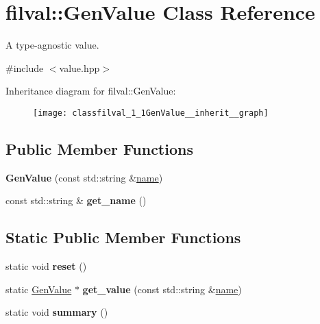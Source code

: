 \hypertarget{classfilval_1_1GenValue}{}\section{filval\+:\+:Gen\+Value Class Reference}
\label{classfilval_1_1GenValue}


A type-\/agnostic value.  




{\ttfamily \#include $<$value.\+hpp$>$}



Inheritance diagram for filval\+:\+:Gen\+Value\+:
\nopagebreak
\begin{figure}[H]
\begin{center}
\leavevmode
\texttt{[image: classfilval\_1\_1GenValue\_\_inherit\_\_graph]}
\end{center}
\end{figure}
\subsection*{Public Member Functions}
\begin{DoxyCompactItemize}
\item 
\hypertarget{classfilval_1_1GenValue_a8e966db95add619c6d85defcb4c866d7}{}\label{classfilval_1_1GenValue_a8e966db95add619c6d85defcb4c866d7} 
{\bfseries Gen\+Value} (const std\+::string \&\hyperlink{classfilval_1_1GenValue_a007e38c03ee041c2a657afa3d6e91ab1}{name})
\item 
\hypertarget{classfilval_1_1GenValue_a38cdc9588f97cb1c5f4ae1c2f8fa326a}{}\label{classfilval_1_1GenValue_a38cdc9588f97cb1c5f4ae1c2f8fa326a} 
const std\+::string \& {\bfseries get\+\_\+name} ()
\end{DoxyCompactItemize}
\subsection*{Static Public Member Functions}
\begin{DoxyCompactItemize}
\item 
\hypertarget{classfilval_1_1GenValue_a6a12aa2c8b6a99573e0fa996f37dd13a}{}\label{classfilval_1_1GenValue_a6a12aa2c8b6a99573e0fa996f37dd13a} 
static void {\bfseries reset} ()
\item 
\hypertarget{classfilval_1_1GenValue_a14659bc5b321f5b914cd911b229f40ef}{}\label{classfilval_1_1GenValue_a14659bc5b321f5b914cd911b229f40ef} 
static \hyperlink{classfilval_1_1GenValue}{Gen\+Value} $\ast$ {\bfseries get\+\_\+value} (const std\+::string \&\hyperlink{classfilval_1_1GenValue_a007e38c03ee041c2a657afa3d6e91ab1}{name})
\item 
\hypertarget{classfilval_1_1GenValue_a0fc8de3214f885848f2f5761dc0800b7}{}\label{classfilval_1_1GenValue_a0fc8de3214f885848f2f5761dc0800b7} 
static void {\bfseries summary} ()
\end{DoxyCompactItemize}
